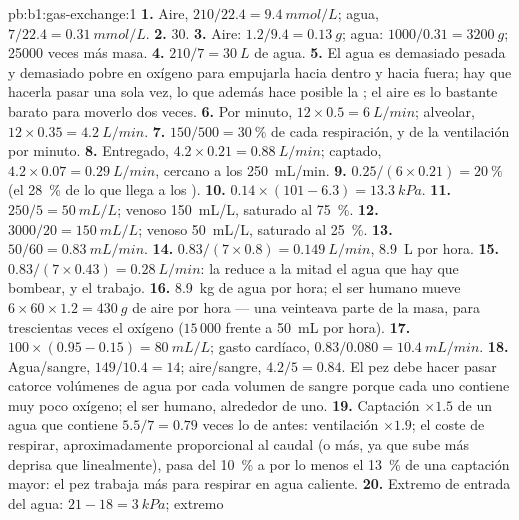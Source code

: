 \begin{solution}{pb:b1:gas-exchange:1}
\textbf{1.} Aire, $210/22.4 = \qty{9.4}{mmol/L}$; agua, $7/22.4 =
\qty{0.31}{mmol/L}$.
\textbf{2.} 30.
\textbf{3.} Aire: $1.2/9.4 = \qty{0.13}{g}$; agua: $1000/0.31 =
\qty{3200}{g}$; \num{25000} veces más masa.
\textbf{4.} $210/7 = \qty{30}{L}$ de agua.
\textbf{5.} El agua es demasiado pesada y demasiado pobre en oxígeno para
empujarla hacia dentro y hacia fuera; hay que hacerla pasar una sola vez, lo
que además hace posible la ; el aire es lo bastante barato
para moverlo dos veces.
\textbf{6.} Por minuto, $12\times 0.5 = \qty{6}{L/min}$; alveolar,
$12\times 0.35 = \qty{4.2}{L/min}$.
\textbf{7.} $150/500 = \qty{30}{\%}$ de cada respiración, y de la ventilación por minuto.
\textbf{8.} Entregado, $4.2\times 0.21 = \qty{0.88}{L/min}$; captado,
$4.2\times 0.07 = \qty{0.29}{L/min}$, cercano a los \qty{250}{mL/min}.
\textbf{9.} $0.25/(6\times 0.21) = \qty{20}{\%}$ (el \qty{28}{\%} de lo que
llega a los ).
\textbf{10.} $0.14\times(101 - 6.3) = \qty{13.3}{kPa}$.
\textbf{11.} $250/5 = \qty{50}{mL/L}$; venoso \qty{150}{mL/L}, saturado al
\qty{75}{\%}.
\textbf{12.} $3000/20 = \qty{150}{mL/L}$; venoso \qty{50}{mL/L}, saturado al
\qty{25}{\%}.
\textbf{13.} $50/60 = \qty{0.83}{mL/min}$.
\textbf{14.} $0.83/(7\times 0.8) = \qty{0.149}{L/min}$, \qty{8.9}{L} por
hora.
\textbf{15.} $0.83/(7\times 0.43) = \qty{0.28}{L/min}$: la 
reduce a la mitad el agua que hay que bombear, y el trabajo.
\textbf{16.} \qty{8.9}{kg} de agua por hora; el ser humano mueve $6\times
60\times 1.2 = \qty{430}{g}$ de aire por hora --- una veinteava parte de
la masa, para trescientas veces el oxígeno ($15\,000$ frente a
\qty{50}{mL} por hora).
\textbf{17.} $100\times(0.95 - 0.15) = \qty{80}{mL/L}$; gasto cardíaco,
$0.83/0.080 = \qty{10.4}{mL/min}$.
\textbf{18.} Agua/sangre, $149/10.4 = 14$; aire/sangre, $4.2/5 = 0.84$. El
pez debe hacer pasar catorce volúmenes de agua por cada volumen de sangre
porque cada uno contiene muy poco oxígeno; el ser humano, alrededor de uno.
\textbf{19.} Captación $\times 1.5$ de un agua que contiene $5.5/7 = 0.79$
veces lo de antes: ventilación $\times 1.9$; el coste de respirar,
aproximadamente proporcional al caudal (o más, ya que sube más deprisa que
linealmente), pasa del \qty{10}{\%} a por lo menos el \qty{13}{\%} de una
captación mayor: el pez trabaja más para respirar en agua caliente.
\textbf{20.} Extremo de entrada del agua: $21 - 18 = \qty{3}{kPa}$; extremo

\end{solution}
